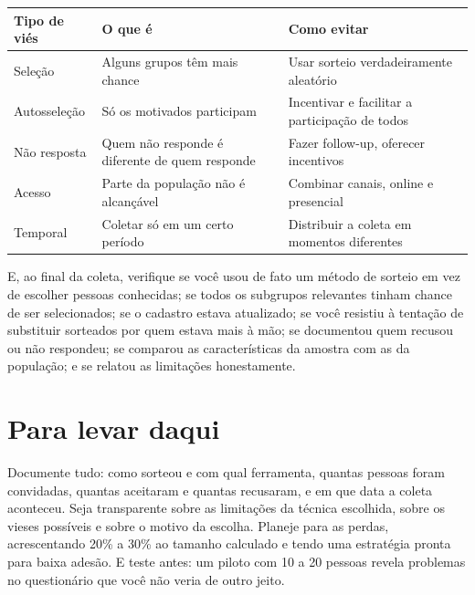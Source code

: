\documentclass[
]{book}
\newcounter{none} %
\begin{document}
{\def\LTcaptype{none} %
\begin{longtable}[]{@{}
  >{\raggedright\arraybackslash}p{}
  >{\raggedright\arraybackslash}p{}
  >{\raggedright\arraybackslash}p{}@{}}
\toprule\noalign{}
\begin{minipage}[b]{\linewidth}\raggedright
Tipo de viés
\end{minipage} & \begin{minipage}[b]{\linewidth}\raggedright
O que é
\end{minipage} & \begin{minipage}[b]{\linewidth}\raggedright
Como evitar
\end{minipage} \\
\midrule\noalign{}
\endhead
\bottomrule\noalign{}
\endlastfoot
Seleção & Alguns grupos têm mais chance & Usar sorteio verdadeiramente aleatório \\
Autosseleção & Só os motivados participam & Incentivar e facilitar a participação de todos \\
Não resposta & Quem não responde é diferente de quem responde & Fazer follow-up, oferecer incentivos \\
Acesso & Parte da população não é alcançável & Combinar canais, online e presencial \\
Temporal & Coletar só em um certo período & Distribuir a coleta em momentos diferentes \\
\end{longtable}
}

E, ao final da coleta, verifique se você usou de fato um método de sorteio em vez de escolher pessoas conhecidas; se todos os subgrupos relevantes tinham chance de ser selecionados; se o cadastro estava atualizado; se você resistiu à tentação de substituir sorteados por quem estava mais à mão; se documentou quem recusou ou não respondeu; se comparou as características da amostra com as da população; e se relatou as limitações honestamente.

\section{Para levar daqui}\label{para-levar-daqui}

Documente tudo: como sorteou e com qual ferramenta, quantas pessoas foram convidadas, quantas aceitaram e quantas recusaram, e em que data a coleta aconteceu. Seja transparente sobre as limitações da técnica escolhida, sobre os vieses possíveis e sobre o motivo da escolha. Planeje para as perdas, acrescentando 20\% a 30\% ao tamanho calculado e tendo uma estratégia pronta para baixa adesão. E teste antes: um piloto com 10 a 20 pessoas revela problemas no questionário que você não veria de outro jeito.
\end{document}

